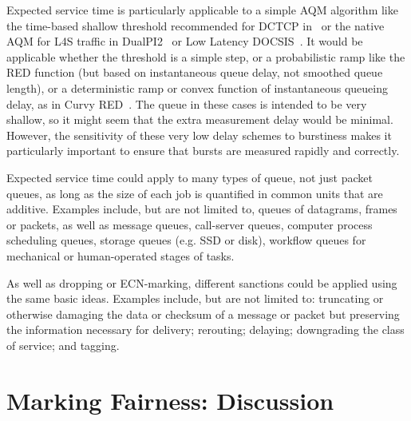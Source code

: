 Expected service time is particularly applicable to a simple AQM algorithm like the time-based shallow threshold recommended for DCTCP in~\cite{Bai16:MQ-ECN} or the native AQM for L4S traffic in DualPI2~\cite[Appx.\ A]{Briscoe15e:DualQ-Coupled-AQM_ID} or Low Latency DOCSIS~\cite{CableLabs:DOCSIS3.1}. It would be applicable whether the threshold is a simple step, or a probabilistic ramp like the RED function (but based on instantaneous queue delay, not smoothed queue length), or a deterministic ramp or convex function of instantaneous queueing delay, as in Curvy RED~\cite[Appx.\ B]{Briscoe15e:DualQ-Coupled-AQM_ID}. The queue in these cases is intended to be very shallow, so it might seem that the extra measurement delay would be minimal. However, the sensitivity of these very low delay schemes to burstiness makes it particularly important to ensure that bursts are measured rapidly and correctly.

Expected service time could apply to many types of queue, not just packet queues, as long as the size of each job is quantified in common units that are additive. Examples include, but are not limited to, queues of datagrams, frames or packets, as well as message queues, call-server queues, computer process scheduling queues, storage queues (e.g. SSD or disk), workflow queues for mechanical or human-operated stages of tasks. 

As well as dropping or ECN-marking, different sanctions could be applied using the same basic ideas. Examples include, but are not limited to: truncating or otherwise damaging the data or checksum of a message or packet but preserving the information necessary for delivery; rerouting; delaying; downgrading the class of service; and tagging.

\section{Marking Fairness: Discussion}\label{sec:marking_fairness_discuss}







